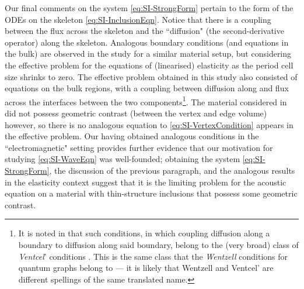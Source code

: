 Our final comments on the system \eqref{eq:SI-StrongForm} pertain to the form of the ODEs on the skeleton \eqref{eq:SI-InclusionEqn}.
Notice that there is a coupling between the flux across the skeleton and the ``diffusion" (the second-derivative operator) along the skeleton.
Analogous boundary conditions (and equations in the bulk) are observed in the study \cite{cherednichenko2019homogenisation} for a similar material setup, but considering the effective problem for the equations of (linearised) elasticity as the period cell size shrinks to zero.
The effective problem obtained in this study also consisted of equations on the bulk regions, with a coupling between diffusion along and flux across the interfaces between the two components\footnote{It is noted in \cite{cherednichenko2019homogenisation} that such conditions, in which coupling diffusion along a boundary to diffusion along said boundary, belong to the (very broad) class of \emph{Ventcel}' conditions \cite{venttsel1959boundary}. This is the same class that the \emph{Wentzell} conditions for quantum graphs belong to --- it is likely that Wentzell and Ventcel' are different spellings of the same translated name.}.
The material considered in \cite{cherednichenko2019homogenisation} did not possess geometric contrast (between the vertex and edge volume) however, so there is no analogous equation to \eqref{eq:SI-VertexCondition} appears in the effective problem.
Our having obtained analogous conditions in the ``electromagnetic" setting provides further evidence that our motivation for studying \eqref{eq:SI-WaveEqn} was well-founded; obtaining the system \eqref{eq:SI-StrongForm}, the discussion of the previous paragraph, and the analogous results in the elasticity context suggest that it is the limiting problem for the acoustic equation on a material with thin-structure inclusions that possess some geometric contrast.

